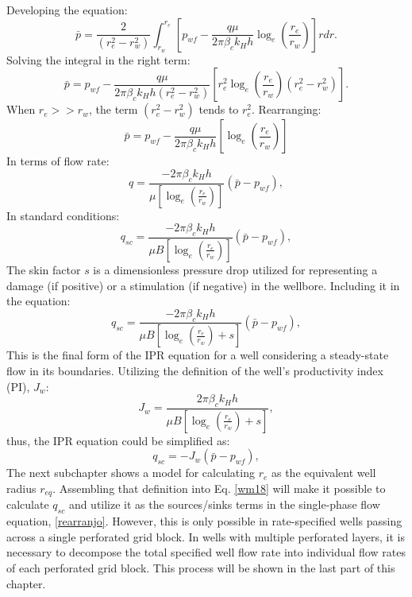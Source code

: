 Developing the equation:
\begin{equation}
\label{wm11}
\bar{p}=\frac{2}{(r_e^2-r_w^2)} \int_{r_w}^{r_e} \left[ p_{wf} - \frac{q \mu}{2 \pi \beta_c k_H h} \log_e \left(\frac{r_e}{r_w}\right) \right] r dr.
\end{equation}
Solving the integral in the right term:
\begin{equation}
\label{wm12}
\bar{p}= p_{wf} - \frac{q \mu}{2 \pi \beta_c k_H h (r_e^2-r_w^2)} \left[ r_e^2 \log_e \left(\frac{r_e}{r_w}\right) (r_e^2-r_w^2) \right].
\end{equation}
When $r_e >> r_w$, the term $(r_e^2-r_w^2)$ tends to $r_e^2$. Rearranging:
\begin{equation}
\label{wm13}
\bar{p}=p_{wf} - \frac{q \mu}{2 \pi \beta_c k_H h}\left[ \log_e \left(\frac{r_e}{r_w}\right)\right]
\end{equation}
In terms of  flow rate:
\begin{equation}
\label{wm14}
q = \frac{- 2 \pi \beta_c k_H h}{\mu \left[ \log_e \left(\frac{r_e}{r_w}\right)\right]} (\bar{p}-p_{wf}),
\end{equation}
In standard conditions:
\begin{equation}
\label{wm15}
q_{sc} = \frac{- 2 \pi \beta_c k_H h}{\mu B \left[ \log_e \left(\frac{r_e}{r_w}\right)\right]} (\bar{p}-p_{wf}),
\end{equation}
The skin factor $s$ is a dimensionless pressure drop utilized for representing a damage (if positive) or a stimulation (if negative) in the wellbore. Including it in the equation:
\begin{equation}
\label{wm16}
q_{sc} = \frac{- 2 \pi \beta_c k_H h}{\mu B \left[ \log_e \left(\frac{r_e}{r_w}\right) + s\right]} (\bar{p}-p_{wf}),
\end{equation}
This is the final form of the IPR equation for a well considering a steady-state flow in its boundaries. Utilizing the definition of the well's productivity index (PI), $J_w$:
\begin{equation}
\label{wm18}
J_w = \frac{ 2 \pi \beta_c k_H h}{\mu B\left[ \log_e \left(\frac{r_e}{r_w}\right) + s\right]},
\end{equation}
thus, the IPR equation could be simplified as:
\begin{equation}
\label{wm17}
q_{sc} = - J_w \left( \bar{p}-p_{wf} \right),
\end{equation}
The next subchapter shows a model for calculating $r_e$ as the equivalent well radius $r_{eq}$. Assembling that definition into Eq. \ref{wm18} will make it possible to calculate $q_{sc}$ and utilize it as the sources/sinks terms in the single-phase flow equation, \ref{rearranjo}. However, this is only possible in rate-specified wells passing across a single perforated grid block. In wells with multiple perforated layers, it is necessary to decompose the total specified well flow rate into individual flow rates of each perforated grid block. This process will be shown in the last part of this chapter.

